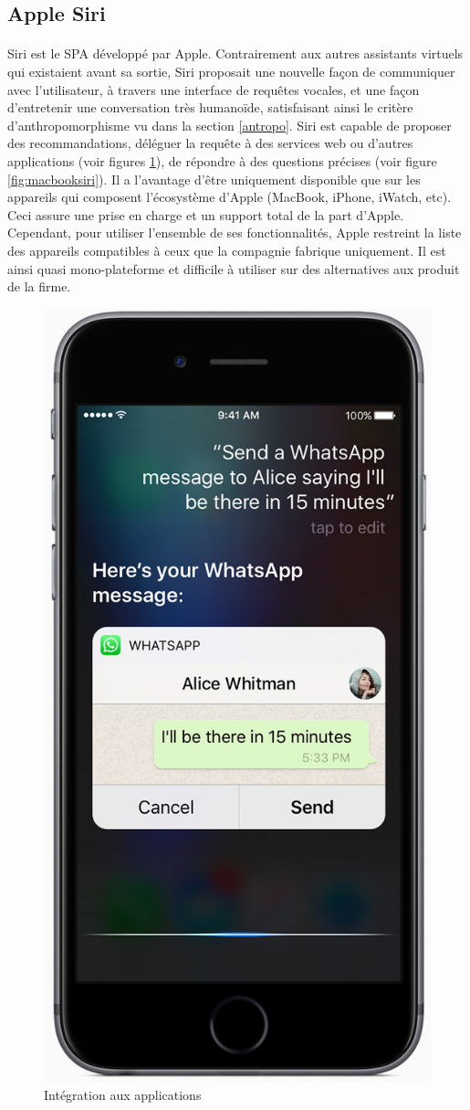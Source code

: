 \subsection{Apple Siri}\label{siri}
\paragraph{}
Siri est le SPA développé par Apple. Contrairement aux autres assistants virtuels qui existaient avant sa sortie, Siri proposait une nouvelle façon de communiquer avec l'utilisateur, à travers une interface de requêtes vocales, et une façon d'entretenir une conversation très humanoïde, satisfaisant ainsi le critère d'anthropomorphisme vu dans la section \ref{antropo}.
Siri est capable de proposer des recommandations, déléguer la requête à des services web ou d'autres applications (voir figures \ref{fig:whatsapp}), de répondre à des questions précises (voir figure \ref{fig:macbooksiri}). Il a l'avantage d'être uniquement disponible que sur les appareils qui composent l'écosystème d'Apple (MacBook, iPhone, iWatch, etc). Ceci assure une prise en charge et un support total de la part d'Apple. Cependant, pour utiliser l'ensemble de ses fonctionnalités, Apple restreint la liste des appareils compatibles à ceux que la compagnie fabrique uniquement. Il est ainsi quasi mono-plateforme et difficile à utiliser sur des alternatives aux produit de la firme.

\begin{figure}[H] 
	\centering
	\includegraphics[width=.25\linewidth]{images/apple_siri/whatsapp.jpg} 
	\caption{Intégration aux applications \citep{siriDemo}}
	\label{fig:whatsapp}
\end{figure}



